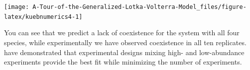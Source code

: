 \documentclass[
]{book}
\newenvironment{Shaded}{\begin{snugshade}}{\end{snugshade}}
\newcommand{\DataTypeTok}[1]{\textcolor[rgb]{0.13,0.29,0.53}{#1}}
\newcommand{\DecValTok}[1]{\textcolor[rgb]{0.00,0.00,0.81}{#1}}
\newcommand{\KeywordTok}[1]{\textcolor[rgb]{0.13,0.29,0.53}{\textbf{#1}}}
\newcommand{\NormalTok}[1]{#1}
\newcommand{\OperatorTok}[1]{\textcolor[rgb]{0.81,0.36,0.00}{\textbf{#1}}}
\newcommand{\StringTok}[1]{\textcolor[rgb]{0.31,0.60,0.02}{#1}}
\begin{document}
\begin{Shaded}
\end{Shaded}

\begin{center}\texttt{[image: A-Tour-of-the-Generalized-Lotka-Volterra-Model\_files/figure-latex/kuebnumerics4-1]} \end{center}

You can see that we predict a lack of coexistence for the system with all four species, while experimentally we have observed coexistence in all ten replicates. \citet{maynard2019predicting} have demonstrated that experimental designs mixing high- and low-abundance experiments provide the best fit while minimizing the number of experiments.

  
\end{document}
